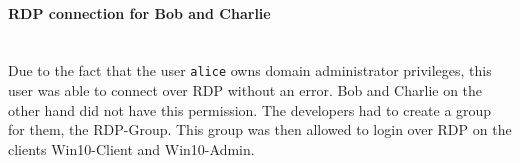 \paragraph{RDP connection for Bob and Charlie}\ \\
Due to the fact that the user \lstinline|alice| owns domain administrator privileges, this user was able to connect over RDP without an error. Bob and Charlie on the other hand did not have this permission. The developers had to create a group for them, the RDP-Group. This group was then allowed to login over RDP on the clients Win10-Client and Win10-Admin. 